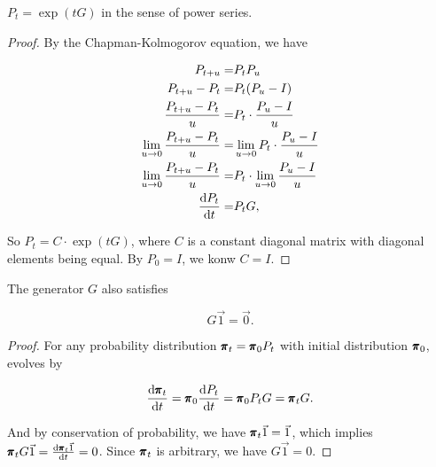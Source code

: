 \begin{proposition}
    $P_t = \exp(tG)$ in the sense of power series.
    
    \begin{proof}
        By the Chapman-Kolmogorov equation, we have 
        
        \begin{align*}
            P_{t+u} = & P_t P_u \\ 
            P_{t+u} - P_t = & P_t (P_u- I) \\ 
            \frac{P_{t+u} - P_t}{u} = & P_t \cdot \frac{P_u - I}{u} \\ 
            \lim_{u \to 0} \frac{P_{t+u} - P_t}{u} = & \lim_{u \to 0} P_t \cdot \frac{P_u - I}{u} \\ 
            \lim_{u \to 0} \frac{P_{t+u} - P_t}{u} = &  P_t \cdot \lim_{u \to 0} \frac{P_u - I}{u} \\ 
            \frac{\dif P_t}{\dif t} = &  P_t G,
        \end{align*}

        So $P_t = C \cdot \exp(tG)$, where $C$ is a constant diagonal matrix with diagonal elements being equal. By $P_0 = I$, we konw $C = I$.
    \end{proof}
\end{proposition}

\begin{proposition}
    The generator $G$ also satisfies 
    
    \begin{equation*}
        G \vec{1} = \vec{0}.
    \end{equation*}

    \begin{proof}
        For any probability distribution $\pmb{\pi}_t = \pmb{\pi}_0 P_t$ with initial distribution $\pmb{\pi}_0$, evolves by 

        \begin{equation*}
            \frac{\dif \mbf{\pi}_t}{\dif t} = \mbf{\pi}_0 \frac{\dif P_t}{\dif t} = \mbf{\pi}_0 P_t G = \mbf{\pi}_t G.
        \end{equation*}

        And by conservation of probability, we have $\pmb{\pi}_t \vec{1} = \vec{1}$, which implies $\mbf{\pi}_t G \vec{1} = \frac{\dif \mbf{\pi}_t \vec{1}}{\dif t} = 0$. Since $\pmb{\pi}_t$ is arbitrary, we have $G \vec{1} = 0$.
    \end{proof}
\end{proposition}

